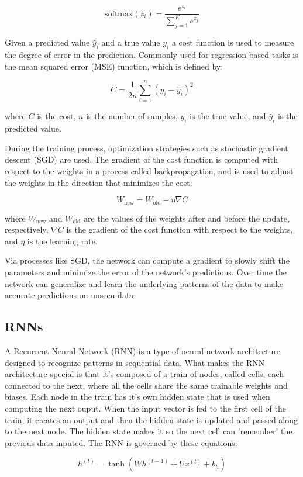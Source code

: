 \documentclass[11pt]{article}
\begin{document}
\[
\text{softmax}(z_i) = \frac{e^{z_i}}{\sum_{j=1}^{K} e^{z_j}}
\]

Given a predicted value \(\hat{y}_i\) and a true value \(y_i\) a cost function is used to measure the degree of error in the prediction. Commonly used for regression-based tasks is the mean squared error (MSE) function, which is defined by:

\[ C = \frac{1}{2n} \sum_{i=1}^{n} (y_i - \hat{y}_i)^2 \]

where \(C\) is the cost, \(n\) is the number of samples, \(y_i\) is the true value, and \(\hat{y}_i\) is the predicted value.

During the training process, optimization strategies such as stochastic gradient descent (SGD) are used. The gradient of the cost function is computed with respect to the weights in a process called backpropagation, and is used to adjust the weights in the direction that minimizes the cost:

\[ W_{\text{new}} = W_{\text{old}} - \eta \nabla C \]

where \(W_{\text{new}}\) and \(W_{\text{old}}\) are the values of the weights after and before the update, respectively, \(\nabla C\) is the gradient of the cost function with respect to the weights, and \(\eta\) is the learning rate.

Via processes like SGD, the network can compute a gradient to slowly shift the parameters and minimize the error of the network's predictions. Over time the network can generalize and learn the underlying patterns of the data to make accurate predictions on unseen data.

\subsection{RNNs}
A Recurrent Neural Network (RNN) is a type of neural network architecture designed to recognize patterns in sequential data. What makes the RNN architecture special is that it's composed of a train of nodes, called cells, each connected to the next, where all the cells share the same trainable weights and biases. Each node in the train has it's own hidden state that is used when computing the next ouput. When the input vector is fed to the first cell of the train, it creates an output and then the hidden state is updated and passed along to the next node. The hidden state makes it so the next cell can 'remember' the previous data inputed. The RNN is governed by these equations:

\begin{equation}
h^{(t)} = \tanh(Wh^{(t-1)} + Ux^{(t)} + b_h)
\end{equation}
\end{document}
